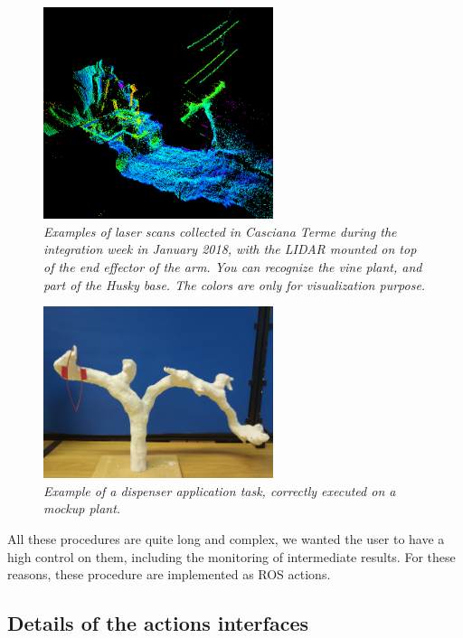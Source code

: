 \begin{figure}
	\centering
	\includegraphics[width=0.6\textwidth]{Images/grape_sw_hw_architecture/scanPoints.png}
	\caption{\textit{Examples of laser scans collected in Casciana Terme during the integration week in January 2018, with the \ac{LIDAR} mounted on top of the end effector of the arm. You can recognize the vine plant, and part of the Husky base. The colors are only for visualization purpose.}}
	\label{fig:pointCloudScanned}
\end{figure}

\begin{figure}
	\centering
	\includegraphics[width=0.6\textwidth]{Images/grape_sw_hw_architecture/deployOnMockup.jpg}
	\caption{\textit{Example of a dispenser application task, correctly executed on a mockup plant.}}
	\label{fig:deploymentOnMockup}
\end{figure}

All these procedures are quite long and complex, we wanted the user to have a high control on them, including the monitoring of intermediate results. For these reasons, these procedure are implemented as \ac{ROS} actions. 



\subsection{Details of the actions interfaces}


